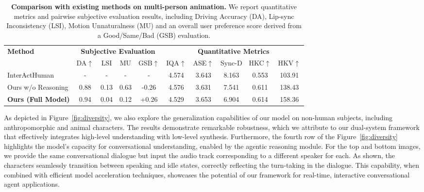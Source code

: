 \begin{table}[t!]
    \centering

    \setlength{\tabcolsep}{6pt} 

    \caption{\textbf{Comparison with existing methods on multi-person animation.} We report quantitative metrics and pairwise subjective evaluation results, including Driving Accuracy (DA), Lip-sync Inconsistency (LSI), Motion Unnaturalness (MU) and an overall user preference score derived from a Good/Same/Bad (GSB) evaluation.}
    \label{tab:sota_comparison_multi_final}
    \label{tab:sota_comparison_multi}
    

    \begin{tabular}{l|cccc|ccccc} 
        \toprule
        \multirow{2}{*}{\textbf{Method}} & \multicolumn{4}{c|}{\textbf{Subjective Evaluation}} & \multicolumn{5}{c}{\textbf{Quantitative Metrics}} \\
        \cmidrule(lr){2-5} \cmidrule(lr){6-10}
        & {\small DA$\uparrow$} & {\small LSI}  & {\small MU} & {\small GSB$\uparrow$} & {\small IQA$\uparrow$} & {\small ASE$\uparrow$} & {\small Sync-D} & {\small HKC$\uparrow$} & {\small HKV$\uparrow$} \\
        \midrule
        InterActHuman       & {-}   & {-}   & {-}   & {-}      & 4.574 & 3.643 & 8.163 & 0.553 & 103.91 \\
        Ours w/o Reasoning  & 0.88 & 0.13 &  0.63 & -0.26   & 4.576 & 3.631 & 7.541 & 0.611 & 138.43 \\
        \midrule
        \textbf{Ours (Full Model)} & 0.94 & 0.04 & 0.12 & +0.26   & 4.529 & 3.653 & 6.904 & 0.614 & 158.36 \\
        \bottomrule
    \end{tabular}
\end{table}




As depicted in Figure~\ref{fig:diversity}, we also explore the generalization capabilities of our model on non-human subjects, including anthropomorphic and animal characters. The results demonstrate remarkable robustness, which we attribute to our dual-system framework that effectively integrates high-level understanding with low-level synthesis.
Furthermore, the fourth row of the Figure~\ref{fig:diversity} highlights the model's capacity for conversational understanding, enabled by the agentic reasoning module. For the top and bottom images, we provide the same conversational dialogue but input the audio track corresponding to a different speaker for each. As shown, the characters seamlessly transition between speaking and idle states, correctly reflecting the turn-taking in the dialogue. This capability, when combined with efficient model acceleration techniques, showcases the potential of our framework for real-time, interactive conversational agent applications.



